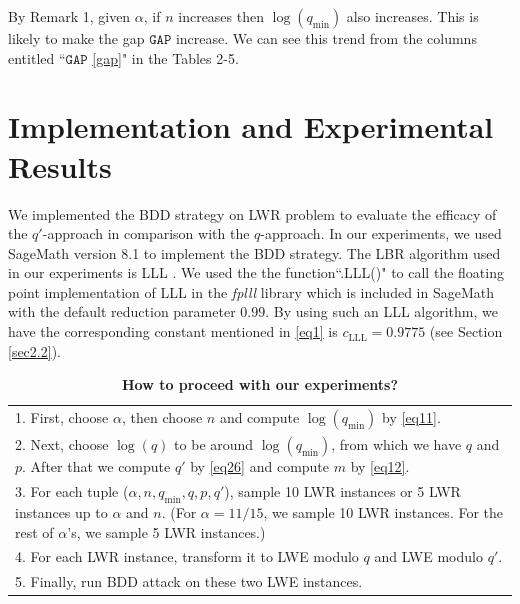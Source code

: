 \documentclass[runningheads]{llncs}
\begin{document}
 \begin{remark} 
By Remark 1, given $\alpha$, if $n$ increases then $\log (q_{\text{min}})$ also increases. This is likely to make the gap $\mathtt{GAP}$ increase. We can see this trend from the columns entitled ``$\mathtt{GAP}$ \eqref{gap}" in the Tables 2-5. 
\end{remark} 


	
\section{Implementation and Experimental Results} \label{sec6}
We implemented the BDD strategy on LWR problem to evaluate the efficacy of the $q'$-approach in comparison with the $q$-approach. In our experiments, we used SageMath version 8.1 \cite{Sag81} to implement the BDD strategy. The LBR algorithm used in our experiments is LLL \cite{LLL82}. We used the the function``.LLL()"  to call the floating point implementation of LLL in the \textit{fplll} library which is included in SageMath with the default reduction parameter $0.99$. By using such an LLL algorithm, we have the corresponding constant mentioned in \eqref{eq1} is $c_{\text{LLL}}=0.9775$ (see Section \ref{sec2.2}). 


\begin{table}[pt]
	\centering
	\small\addtolength{\tabcolsep}{1.5pt}
	\caption{\textbf{How to proceed with our experiments?} } 
	
	\begin{tabular}{p{10cm}}
		
		\hline
		\hline
		
		1. First, choose $\alpha$, then choose $n$ and compute $\log (q_{\text{min}})$ by \eqref{eq11}. \\
		2. Next, choose $\log (q)$ to be around $\log (q_{\text{min}})$, from which we have $q$ and $p$. After that we compute $q'$ by \eqref{eq26} and compute $m$ by \eqref{eq12}.\\
		3. For each tuple ($\alpha, n, q_{\text{min}}, q, p, q'$), sample 10 LWR instances or 5 LWR instances up to $\alpha$ and $n$. (For $\alpha=11/15$, we sample 10 LWR instances. For the rest of $\alpha$'s, we sample 5 LWR instances.)\\
		4. For each LWR instance, transform it to LWE modulo $q$ and LWE modulo $q'$. \\
		5. Finally, run BDD attack on these two LWE instances. \\
		\hline
		\hline
		
	\end{tabular}
	\label{table:1}
\end{table}
\end{document}

